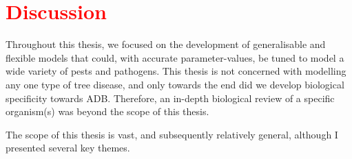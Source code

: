 
\chapter{\textcolor{red}{Discussion}}
Throughout this thesis, we focused on the development of generalisable and flexible models that could, with accurate parameter-values, be tuned to model a wide variety of pests and pathogens. This thesis is not concerned with modelling any one type of tree disease, and only towards the end did we develop biological specificity towards ADB. Therefore, an in-depth biological review of a specific organism(s) was beyond the scope of this thesis.


The scope of this thesis is vast, and subsequently relatively general, although I presented several key themes.





